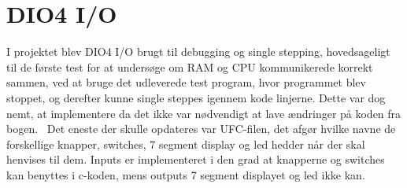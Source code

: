 \section{DIO4 I/O}
I projektet blev DIO4 I/O brugt til debugging og single stepping, hovedsageligt til de første test for at undersøge om RAM og CPU kommunikerede korrekt sammen, ved at bruge det udleverede test program, hvor programmet blev stoppet, og derefter kunne single steppes igennem kode linjerne. Dette var dog nemt, at implementere da det ikke var nødvendigt at lave ændringer på koden fra bogen.~\cite{chu} Det eneste der skulle opdateres var UFC-filen, det afgør hvilke navne de forskellige knapper, switches, 7 segment display og led hedder når der skal henvises til dem.
Inputs er implementeret i den grad at knapperne og switches kan benyttes i c-koden, mens outputs 7 segment displayet og led ikke kan.